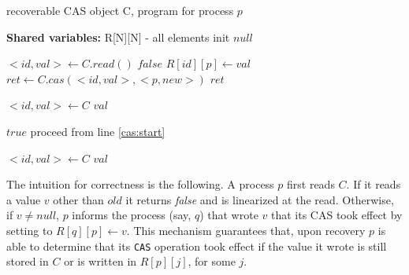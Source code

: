 \begin{algorithm}%
	\caption{recoverable CAS object C, program for process $p$}
	\label{alg:recoverable-CAS}
	
	\hspace*{\algorithmicindent} \textbf{Shared variables:}
	R[N][N] - all elements init $null$

	\begin{multicols}{2}
	\begin{algorithmic}[1]
		\State ${<}id,val{>} \gets C.read()$ \label{cas:start}
		 \label{cas:if-compare-read}
		\State \Return $false$ \label{cas:return-false}
		\EndIf
  		\State $R[id][p] \gets val$ \label{cas:write-C-value}
		\EndIf
		\State $ret \gets C.cas({<}id,va{l}>, {<}p,new{>})$ \label{cas:primitive-apply}
		\State \Return $ret$ \label{cas:operation-return}
		\EndProcedure
		
		\State ${<}id,val{>} \gets C$ \label{cas:read-start}
		\State \Return $val$ \label{cas:read-return}
		\EndProcedure
		
		\columnbreak
		
		\State \Return $true$ \label{cas:recover-returns-true}
		\Else {}
		\State proceed from line \ref{cas:start} \label{cas:recover-re-execute}
		\EndIf
		\EndProcedure
		
		\State ${<}id,val{>} \gets C$ \label{cas:read-recover-start}
		\State \Return $val$ \label{cas:read-recover-return}
		\EndProcedure
	\end{algorithmic}
\end{multicols}
\end{algorithm}

The intuition for correctness is the following.
A process $p$ first reads $C$. If it reads a value $v$ other than $old$ it returns \emph{false} and is linearized at the read. Otherwise, if $v \neq {null}$, $p$ informs the process (say, $q$) that wrote $v$ that its CAS took effect by setting to $R[q][p] \gets v$.
This mechanism guarantees that, upon recovery $p$ is able to determine that its \texttt{CAS} operation took effect if the value it wrote is still stored in $C$ or is written in $R[p][j]$, for some $j$.

